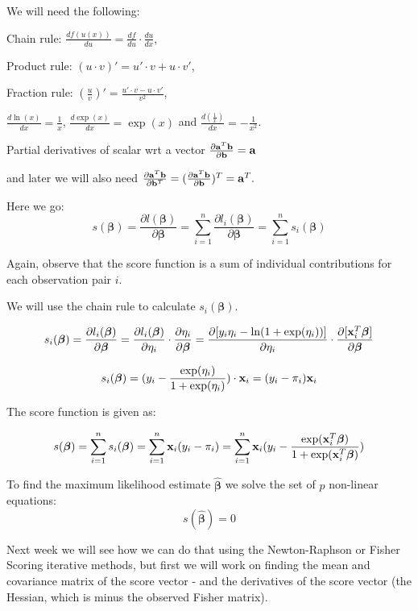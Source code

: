 \documentclass[
  ignorenonframetext,
]{beamer}
\begin{document}
\begin{frame}
We will need the following:

Chain rule: \(\frac{d f(u(x))}{du}=\frac{df}{du}\cdot \frac{du}{dx}\),

Product rule: \((u\cdot v)'=u'\cdot v+u\cdot v'\),

Fraction rule: \((\frac{u}{v})'=\frac{u' \cdot v - u\cdot v'}{v^2}\),

\(\frac{d \ln(x)}{dx}=\frac{1}{x}\), \(\frac{d\exp(x)}{dx}=\exp(x)\) and
\(\frac{d(\frac{1}{x})}{dx}=-\frac{1}{x^2}\).

Partial derivatives of scalar wrt a vector
\(\frac{\partial{\bf a}^T{\bf b}}{\partial {\bf b}}={\bf a}\)

and later we will also need
\(\frac{\partial{\bf a}^T{\bf b}}{\partial {\bf b}^T}=(\frac{\partial{\bf a}^T{\bf b}}{\partial {\bf b}})^T={\bf a}^T.\)
\end{frame}

\begin{frame}
Here we go:
\[s(\boldsymbol{\beta})=\frac{\partial l(\boldsymbol{\beta})}{\partial \boldsymbol{\beta}}=
\sum_{i=1}^n \frac{\partial l_i(\boldsymbol{\beta})}{\partial \boldsymbol{\beta}}=
\sum_{i=1}^n s_i(\boldsymbol{\beta})\]

Again, observe that the score function is a sum of individual
contributions for each observation pair \(i\).
\end{frame}

\begin{frame}
We will use the chain rule to calculate \(s_i(\boldsymbol{\beta})\).

\[s_i(\boldsymbol{\beta})=\frac{\partial l_i(\boldsymbol{\beta})}{\partial \boldsymbol{\beta}}=\frac{\partial l_i(\boldsymbol{\beta})}{\partial \eta_i}\cdot \frac{\partial \eta_i}{\partial \boldsymbol{\beta}}=\frac{\partial [y_i\eta_i-\ln(1+{\exp(\eta_i)})]}{\partial \eta_i}\cdot \frac{\partial [{\bf x}_i^T\boldsymbol{\beta} ]}{\partial \boldsymbol{\beta}}\]

\[s_i(\boldsymbol{\beta})=(y_i-\frac{\exp(\eta_i)}{1+\exp(\eta_i)})\cdot {\bf x}_i=(y_i-\pi_i) {\bf x}_i \]
\end{frame}

\begin{frame}
The score function is given as:

\[s(\boldsymbol{\beta})=\sum_{i=1}^n s_i(\boldsymbol{\beta})=\sum_{i=1}^n {\bf x}_i (y_i-\pi_i)=\sum_{i=1}^n {\bf x}_i (y_i-\frac{\exp({\bf x}_i^T\boldsymbol{\beta})}{1+\exp({\bf x}_i^T\boldsymbol{\beta})})\]

To find the maximum likelihood estimate \(\hat{\boldsymbol{\beta}}\) we
solve the set of \(p\) non-linear equations:
\[s(\hat{\boldsymbol{\beta}})=0\]

Next week we will see how we can do that using the Newton-Raphson or
Fisher Scoring iterative methods, but first we will work on finding the
mean and covariance matrix of the score vector - and the derivatives of
the score vector (the Hessian, which is minus the observed Fisher
matrix).
\end{frame}
\end{document}
